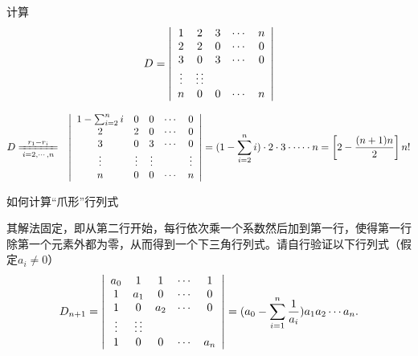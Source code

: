 \begin{li}
  计算
  $$
  D= \left|
    \begin{array}{ccccc}
      1 &  2  & 3   &\cdots & n   \\
      2 &  2  & 0   &\cdots & 0  \\
      3 &  0  & 3   &\cdots & 0  \\
      \vdots & \vdots  \vdots  &    & \\
      n &  0  & 0   &\cdots & n
    \end{array}
  \right|
  $$
\end{li}
\begin{jie}
  $$
  \begin{aligned}
    D & \xlongequal[i=2,\cd,n]{r_1-r_i} & 
    \left|
      \begin{array}{ccccc}
        1-\sum_{i=2}^n i &  0  & 0   &\cd & 0   \\
        2 &  2  & 0   &\cd & 0  \\
        3 &  0  & 3   &\cd & 0  \\
        \vd & \vd & \vd  &    &\vd  \\
        n &  0  & 0   &\cd & n
      \end{array}
    \right|
    =  (1-\sum_{i=2}^n i) \cdot 2 \cdot 3 \cdot \cd \cdot n
    =  \left[2-\frac{(n+1)n}2\right] n!
  \end{aligned}
  $$
\end{jie}

如何计算“爪形”行列式
\begin{figure}
  \centering
\end{figure}
其解法固定，即从第二行开始，每行依次乘一个系数然后加到第一行，使得第一行除第一个元素外都为零，从而得到一个下三角行列式。请自行验证以下行列式（假定$a_i \ne 0$）
$$
D_{n+1} = 
\left|
  \begin{array}{ccccc}
    a_0 &  1  & 1   &\cdots & 1   \\
    1   & a_1 & 0   &\cdots & 0  \\
    1   & 0   & a_2 &\cdots & 0  \\
    \vdots & \vdots  \vdots  &    & \\
    1   & 0   & 0   &\cdots & a_n
  \end{array}
\right|  = (a_0 - \sum_{i=1}^n \frac1{a_i}) a_1 a_2 \cdots a_n.
$$

